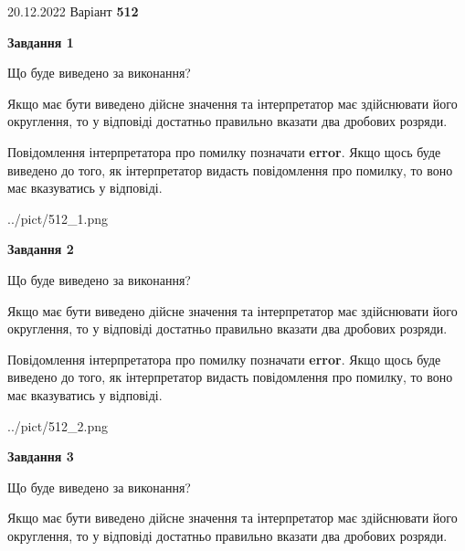 \documentclass[12pt, ukrainian]{article}
\begin{document}
{20.12.2022 Варіант \No \textbf { 512 }\par}
{
\begin {Large}

{\begin {center}\textbf{Завдання 1}\end {center}}\par
Що буде виведено за виконання? \par

Якщо має бути виведено дійсне значення та інтерпретатор має здійснювати його округлення, 
то у відповіді достатньо правильно вказати два дробових розряди.

Повідомлення інтерпретатора про помилку позначати \textbf{error}.
Якщо щось буде виведено до того, як інтерпретатор видасть повідомлення про помилку, 
то воно має вказуватись у відповіді. \par

\begin{center}
	{../pict/512_1.png}
\end{center}
\newpage

{\begin {center}\textbf{Завдання 2}\end {center}}\par
Що буде виведено за виконання? \par

Якщо має бути виведено дійсне значення та інтерпретатор має здійснювати його округлення, 
то у відповіді достатньо правильно вказати два дробових розряди.

Повідомлення інтерпретатора про помилку позначати \textbf{error}.
Якщо щось буде виведено до того, як інтерпретатор видасть повідомлення про помилку, 
то воно має вказуватись у відповіді. \par

\begin{center}
	{../pict/512_2.png}
\end{center}
\newpage

{\begin {center}\textbf{Завдання 3}\end {center}}\par
Що буде виведено за виконання? \par

Якщо має бути виведено дійсне значення та інтерпретатор має здійснювати його округлення, 
то у відповіді достатньо правильно вказати два дробових розряди.


\end{Large}}
\end{document}
